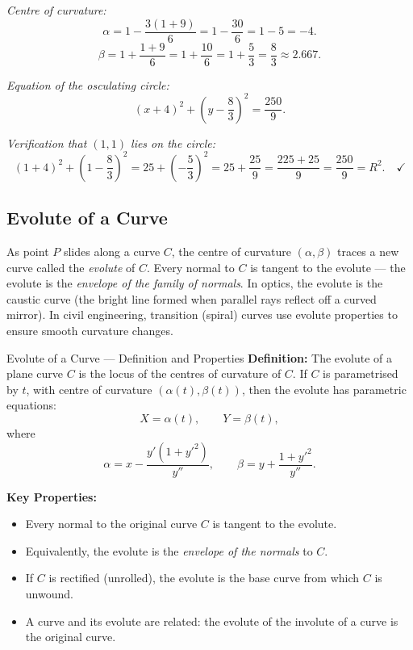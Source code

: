 \documentclass[12pt,a4paper]{article}
\begin{document}
\textit{Centre of curvature:}
\[
  \alpha = 1 - \frac{3(1+9)}{6} = 1 - \frac{30}{6} = 1 - 5 = -4.
\]
\[
  \beta = 1 + \frac{1+9}{6} = 1 + \frac{10}{6} = 1 + \frac{5}{3} = \frac{8}{3} \approx 2.667.
\]

\textit{Equation of the osculating circle:}
\[
  \boxed{(x+4)^{2} + \left(y - \frac{8}{3}\right)^{2} = \frac{250}{9}.}
\]

\textit{Verification that $(1,1)$ lies on the circle:}
\[
  (1+4)^{2} + \left(1-\frac{8}{3}\right)^{2} = 25 + \left(-\frac{5}{3}\right)^{2} = 25 + \frac{25}{9} = \frac{225+25}{9} = \frac{250}{9} = R^{2}.\quad\checkmark
\]

\subsection{Evolute of a Curve}

As point $P$ slides along a curve $C$, the centre of curvature $(\alpha, \beta)$ traces a new curve called the \emph{evolute} of $C$. Every normal to $C$ is tangent to the evolute --- the evolute is the \emph{envelope of the family of normals}. In optics, the evolute is the caustic curve (the bright line formed when parallel rays reflect off a curved mirror). In civil engineering, transition (spiral) curves use evolute properties to ensure smooth curvature changes.

\begin{infobox}{Evolute of a Curve --- Definition and Properties}
\textbf{Definition:} The evolute of a plane curve $C$ is the locus of the centres of curvature of $C$. If $C$ is parametrised by $t$, with centre of curvature $(\alpha(t), \beta(t))$, then the evolute has parametric equations:
\[
  X = \alpha(t), \qquad Y = \beta(t),
\]
where
\[
  \alpha = x - \frac{y'(1+y'^{2})}{y''}, \qquad \beta = y + \frac{1+y'^{2}}{y''}.
\]

\textbf{Key Properties:}
\begin{itemize}[nosep]
  \item Every normal to the original curve $C$ is tangent to the evolute.
  \item Equivalently, the evolute is the \emph{envelope of the normals} to $C$.
  \item If $C$ is rectified (unrolled), the evolute is the base curve from which $C$ is unwound.
  \item A curve and its evolute are related: the evolute of the involute of a curve is the original curve.
\end{itemize}
\end{infobox}
\end{document}

